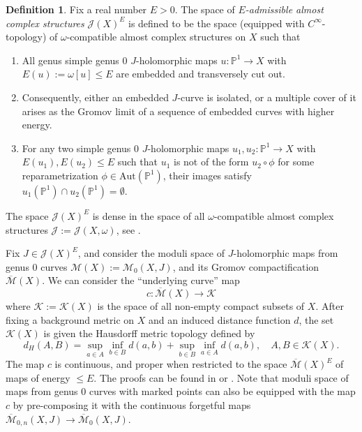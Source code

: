 \documentclass[reqno]{amsart}
\numberwithin{equation}{section}
\numberwithin{equation}{section}
\numberwithin{equation}{section}
\theoremstyle{definition}
\newtheorem{defn}[thm]{Definition}
\theoremstyle{remark}
\theoremstyle{remark}
\newcommand{\ov}{\overline}
\begin{document}
\begin{defn} Fix a real number $E > 0$. The space of \emph{$E$-admissible almost complex structures} $\mathcal{J}(X)^E$ is defined to be the space (equipped with $C^\infty$-topology) of $\omega$-compatible almost complex structures on $X$ such that
\begin{enumerate}
    \item All genus simple genus $0$ $J$-holomorphic maps $u: \mathbb{P}^1 \to X$ with $E(u) := \omega[u] \leq E$ are embedded and transversely cut out.
    \item Consequently, either an embedded $J$-curve is isolated, or a multiple cover of it arises as the Gromov limit of a sequence of embedded curves with higher energy.
    \item For any two simple genus $0$ $J$-holomorphic maps $u_1, u_2: \mathbb{P}^1 \to X$ with $E(u_1), E(u_2) \leq E$ such that $u_1$ is not of the form $u_2 \circ \phi$ for some reparametrization $\phi \in \mathrm{Aut}(\mathbb{P}^1)$, their images satisfy $u_1(\mathbb{P}^1) \cap u_2(\mathbb{P}^1) = \emptyset$.
\end{enumerate}
\end{defn}
The space $\mathcal{J}(X)^E$ is dense in the space of all $\omega$-compatible almost complex structures $\mathcal{J} := \mathcal{J}(X,\omega)$, see \cite[Corollary 1.4]{IP-GV}.

Fix $J \in \mathcal{J}(X)^E$, and consider the moduli space of $J$-holomorphic maps from genus $0$ curves $\mathcal{M}(X):= \mathcal{M}_0(X, J)$, and its Gromov compactification $\ov{\mathcal{M}}(X)$. We can consider the ``underlying curve'' map
\begin{equation}
    c : \overline{\mathcal{M}}(X) \to \mathcal{K}
\end{equation}
where $\mathcal{K} := \mathcal{K}(X)$ is the space of all non-empty compact subsets of $X$. After fixing a background metric on $X$ and an induced distance function $d$, the set $\mathcal{K}(X)$ is given the Hausdorff metric topology defined by
\begin{equation}
    d_H(A, B) = \sup_{a \in A} \inf_{b \in B} d(a,b) + \sup_{b \in B} \inf_{a \in A} d(a, b), \quad A, B \in \mathcal{K}(X).
\end{equation}
The map $c$ is continuous, and proper when restricted to the space $\ov{\mathcal{M}}(X)^E$ of maps of energy $\le E$. The proofs can be found in \cite[Section 1]{IP-GV} or \cite[Theorem 2.11]{doan2021gopakumar}. Note that moduli space of maps from genus $0$ curves with marked points can also be equipped with the map $c$ by pre-composing it with the continuous forgetful maps $\ov{\mathcal{M}}_{0,n}(X, J) \to \ov{\mathcal{M}}_{0}(X,J)$. 
\end{document}
